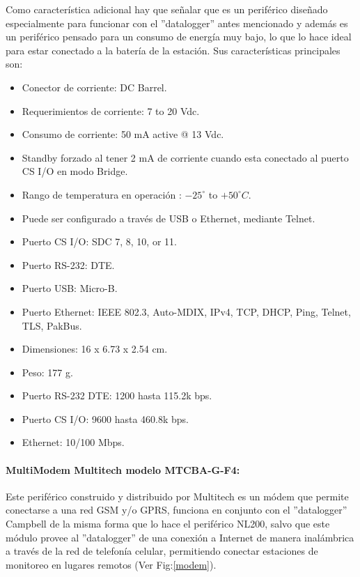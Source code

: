 Como característica adicional hay que señalar que es un periférico diseñado especialmente para funcionar con el ''datalogger'' antes mencionado y además es un periférico pensado para un consumo de energía muy bajo, lo que lo hace ideal para estar conectado a la batería de la estación. Sus características principales son:

\begin{itemize}
\item Conector de corriente: DC Barrel.
\item Requerimientos de corriente: 7 to 20 Vdc. 
\item Consumo de corriente: 50 mA active @ 13 Vdc.
\item Standby forzado al tener 2 mA de corriente cuando esta conectado al puerto CS I/O en modo Bridge.
\item Rango de temperatura en operación : ${-25}^{\circ}$ to ${+50}^{\circ}C$.
\item Puede ser configurado a través de USB o Ethernet, mediante Telnet.
\item Puerto CS I/O: SDC 7, 8, 10, or 11.
\item Puerto RS-232: DTE.
\item Puerto USB: Micro-B.
\item Puerto Ethernet: IEEE 802.3, Auto-MDIX, IPv4, TCP, DHCP, Ping, Telnet, TLS, PakBus.
\item Dimensiones: 16 x 6.73 x 2.54 cm.
\item Peso: 177 g.
\item Puerto RS-232 DTE: 1200 hasta 115.2k bps.
\item Puerto CS I/O: 9600 hasta 460.8k bps.
\item Ethernet: 10/100 Mbps.
\end{itemize}

\paragraph{MultiModem Multitech modelo MTCBA-G-F4:}
Este periférico construido y distribuido por Multitech\cite{hardware:multitech} es un módem que permite conectarse a una red GSM y/o GPRS, funciona en conjunto con el ''datalogger'' Campbell de la misma forma que lo hace el periférico NL200, salvo que este módulo provee al ''datalogger'' de una conexión a Internet de manera inalámbrica a través de la red de telefonía celular, permitiendo conectar estaciones de monitoreo en lugares remotos (Ver Fig:\ref{modem}).\\

